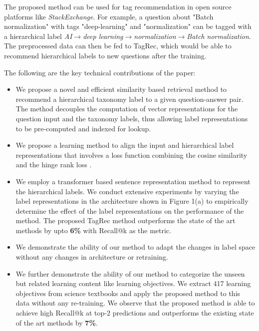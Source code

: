 \documentclass[runningheads, envcountsame, a4paper]{llncs}
\begin{document}
The proposed method can be used for tag recommendation in open source platforms like \textit{StackExchange}. For example, a question about "Batch normalization" with tags "deep-learning" and "normalization" can be tagged with a hierarchical label \textit{AI$\xrightarrow{}$deep learning$\xrightarrow{}$normalization$\xrightarrow{}$Batch normalization}.  The preprocessed data can then be fed to TagRec, which would be able to recommend hierarchical labels to new questions after the training.



The following are the key technical contributions of the paper:
\let\labelitemi\labelitemii
\begin{itemize}
 \setlength\itemsep{0.1em}

    \item We propose a novel and efficient similarity based retrieval method to recommend a hierarchical taxonomy label to a given question-answer pair. The method decouples the computation of vector representations for the question input and the taxonomy labels, thus allowing label representations to be pre-computed and indexed for lookup.
    \item We propose a learning method to align the input and hierarchical label representations that involves a loss function combining the cosine similarity and the hinge rank loss \cite{frome2013devise}.
    \item  We employ a transformer based sentence representation method to represent the hierarchical labels. We conduct extensive experiments by varying the label representations in the architecture shown in Figure 1(a) to empirically determine the effect of the label representations on the performance of the method. The proposed TagRec method outperforms the state of the art methods by upto \textbf{6\%} with Recall@k as the metric.
    \item We demonstrate the ability of our method to adapt the changes in label space without any changes in architecture or retraining. 
     \item We further demonstrate the ability of our method to categorize the unseen but related learning content like learning objectives. We extract 417 learning objectives from science textbooks and apply the proposed method to this data without any re-training. We observe that the proposed method is able to achieve high Recall@k at top-2 predictions and outperforms the existing state of the art methods by \textbf{7\%}.
\end{itemize}
\end{document}
